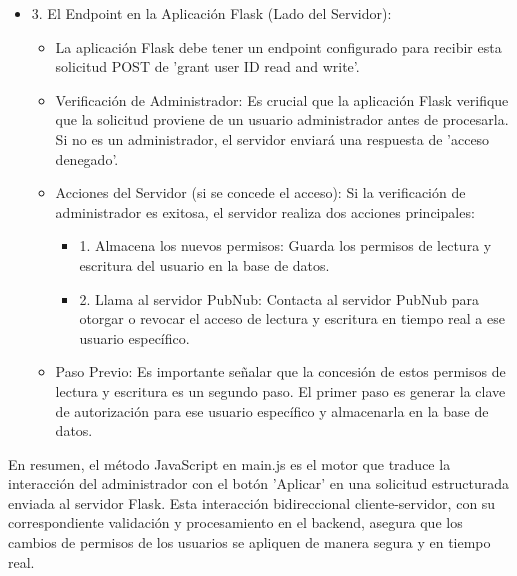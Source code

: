 \documentclass{report}
\begin{document}
\begin{itemize}
\begin{itemize}
        \end{itemize}
    \item 3. El Endpoint en la Aplicación Flask (Lado del Servidor):
        \begin{itemize}
            \item La aplicación Flask debe tener un endpoint configurado para recibir esta solicitud POST de 'grant user ID read and write'.
            \item Verificación de Administrador: Es crucial que la aplicación Flask verifique que la solicitud proviene de un usuario administrador antes de procesarla. Si no es un administrador, el servidor enviará una respuesta de 'acceso denegado'.
            \item Acciones del Servidor (si se concede el acceso): Si la verificación de administrador es exitosa, el servidor realiza dos acciones principales:
                \begin{itemize}
                    \item 1. Almacena los nuevos permisos: Guarda los permisos de lectura y escritura del usuario en la base de datos.
                    \item 2. Llama al servidor PubNub: Contacta al servidor PubNub para otorgar o revocar el acceso de lectura y escritura en tiempo real a ese usuario específico.                
                \end{itemize}
            \item Paso Previo: Es importante señalar que la concesión de estos permisos de lectura y escritura es un segundo paso. El primer paso es generar la clave de autorización para ese usuario específico y almacenarla en la base de datos.        
        \end{itemize}
\end{itemize}
En resumen, el método JavaScript en main.js es el motor que traduce la interacción del administrador con el botón 'Aplicar' en una 
solicitud estructurada enviada al servidor Flask. Esta interacción bidireccional cliente-servidor, con su correspondiente validación 
y procesamiento en el backend, asegura que los cambios de permisos de los usuarios se apliquen de manera segura y en tiempo real.
\end{document}
